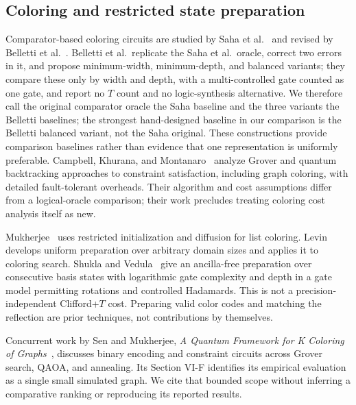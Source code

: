 \documentclass[sigconf, natbib]{acmart}
\begin{document}
\subsection{Coloring and restricted state preparation}
\label{subsec:related-coloring}
Comparator-based coloring circuits are studied by Saha et al.~\cite{saha} and revised by Belletti et al.~\cite{belletti}. Belletti et al.\ replicate the Saha et al.\ oracle, correct two errors in it, and propose minimum-width, minimum-depth, and balanced variants; they compare these only by width and depth, with a multi-controlled gate counted as one gate, and report no $T$ count and no logic-synthesis alternative. We therefore call the original comparator oracle the Saha baseline and the three variants the Belletti baselines; the strongest hand-designed baseline in our comparison is the Belletti balanced variant, not the Saha original. These constructions provide comparison baselines rather than evidence that one representation is uniformly preferable. Campbell, Khurana, and Montanaro~\cite{CampbellColoring} analyze Grover and quantum backtracking approaches to constraint satisfaction, including graph coloring, with detailed fault-tolerant overheads. Their algorithm and cost assumptions differ from a logical-oracle comparison; their work precludes treating coloring cost analysis itself as new.

Mukherjee~\cite{MukherjeeList} uses restricted initialization and diffusion for list coloring. Levin~\cite{LevinUniform} develops uniform preparation over arbitrary domain sizes and applies it to coloring search. Shukla and Vedula~\cite{Shukla2024} give an ancilla-free preparation over consecutive basis states with logarithmic gate complexity and depth in a gate model permitting rotations and controlled Hadamards. This is not a precision-independent Clifford+$T$ cost. Preparing valid color codes and matching the reflection are prior techniques, not contributions by themselves.

Concurrent work by Sen and Mukherjee, \emph{A Quantum Framework for K Coloring of Graphs}~\cite{SenMukherjee2026}, discusses binary encoding and constraint circuits across Grover search, QAOA, and annealing. Its Section VI-F identifies its empirical evaluation as a single small simulated graph. We cite that bounded scope without inferring a comparative ranking or reproducing its reported results.
\end{document}
